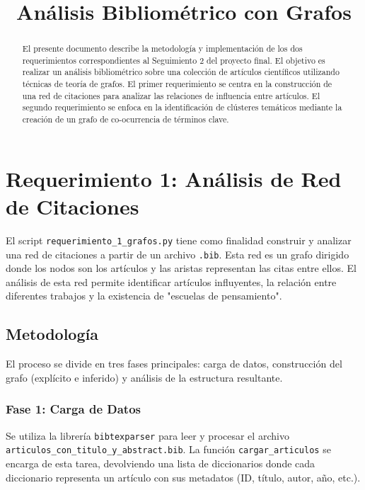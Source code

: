 \documentclass[10pt,a4paper]{article}
\title{Análisis Bibliométrico con Grafos}
\begin{document}
\maketitle
\thispagestyle{fancy} %

\begin{abstract}
El presente documento describe la metodología y implementación de los dos requerimientos correspondientes al Seguimiento 2 del proyecto final. El objetivo es realizar un análisis bibliométrico sobre una colección de artículos científicos utilizando técnicas de teoría de grafos. El primer requerimiento se centra en la construcción de una red de citaciones para analizar las relaciones de influencia entre artículos. El segundo requerimiento se enfoca en la identificación de clústeres temáticos mediante la creación de un grafo de co-ocurrencia de términos clave.
\end{abstract}

\tableofcontents
\newpage

\section{Requerimiento 1: Análisis de Red de Citaciones}
El script \texttt{requerimiento\_1\_grafos.py} tiene como finalidad construir y analizar una red de citaciones a partir de un archivo \texttt{.bib}. Esta red es un grafo dirigido donde los nodos son los artículos y las aristas representan las citas entre ellos. El análisis de esta red permite identificar artículos influyentes, la relación entre diferentes trabajos y la existencia de "escuelas de pensamiento".

\subsection{Metodología}
El proceso se divide en tres fases principales: carga de datos, construcción del grafo (explícito e inferido) y análisis de la estructura resultante.

\subsubsection{Fase 1: Carga de Datos}
Se utiliza la librería \texttt{bibtexparser} para leer y procesar el archivo \texttt{articulos\_con\_titulo\_y\_abstract.bib}. La función \texttt{cargar\_articulos} se encarga de esta tarea, devolviendo una lista de diccionarios donde cada diccionario representa un artículo con sus metadatos (ID, título, autor, año, etc.).
\end{document}

